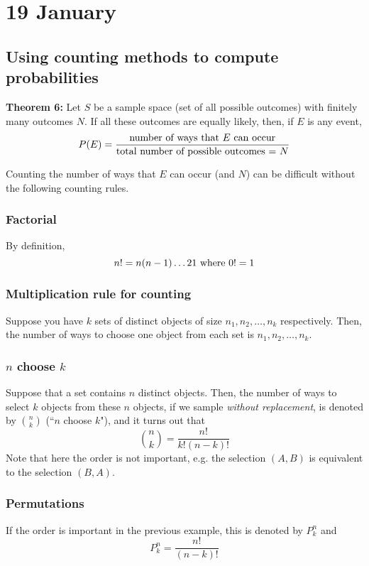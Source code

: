 \documentclass[12pt]{article}
\begin{document}
\section{19 January}
\subsection{Using counting methods to compute probabilities}
\textbf{Theorem 6:} Let $S$ be a sample space (set of all possible outcomes) with finitely many outcomes $N$. If all these outcomes are equally likely, then, if $E$ is any event,
\[
	P(E) = \frac{\textnormal{number of ways that $E$ can occur}}{\textnormal{total number of possible outcomes = $N$}}
\]

Counting the number of ways that $E$ can occur (and $N$) can be difficult without the following counting rules.

\subsubsection{Factorial}
By definition,
\[
	n! = n(n-1)\dots 2 1 \textnormal{ where } 0! = 1
\]

\subsubsection{Multiplication rule for counting}
Suppose you have $k$ sets of distinct objects of size $n_1, n_2, \dots, n_k$ respectively. Then, the number of ways to choose one object from each set is $n_1, n_2, \dots, n_k$.

\subsubsection{$n$ choose $k$}
Suppose that a set contains $n$ distinct objects. Then, the number of ways to select $k$ objects from these $n$ objects, if we sample \emph{without replacement}, is denoted by ${n \choose k}$ (``$n$ choose $k$"), and it turns out that
\[
	{n \choose k} = \frac{n!}{k! (n-k)!}
\]
Note that here the order is not important, e.g. the selection $(A,B)$ is equivalent to the selection $(B,A)$.

\subsubsection{Permutations}
If the order is important in the previous example, this is denoted by $P_k^n$ and
\[
	P_k^n = \frac{n!}{(n-k)!}
\]
\end{document}
